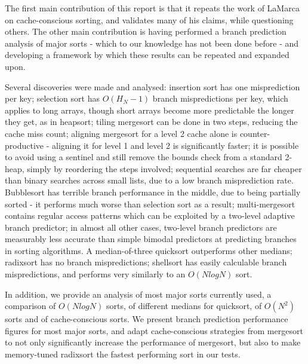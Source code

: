 The first main contribution of this report is that it repeats the work of LaMarca
on cache-conscious sorting, and validates many of his claims, while questioning
others. The other main contribution is having performed a branch prediction
analysis of major sorts - which to our knowledge has not been done before - and
developing a framework by which these results can be repeated and expanded upon.

Several discoveries were made and analysed: insertion sort has one misprediction
per key; selection sort has $O(H_N-1)$ branch mispredictions per key, which
applies to long arrays, though short arrays become more predictable the longer
they get, as in heapsort; tiling mergesort can be done in two steps, reducing
the cache miss count; aligning mergesort for a level 2 cache alone is
counter-productive - aligning it for level 1 and level 2 is significantly
faster; it is possible to avoid using a sentinel and still remove the bounds
check from a standard 2-heap, simply by reordering the steps involved;
sequential searches are far cheaper than binary searches across small lists, due
to a low branch misprediction rate. Bubblesort has terrible branch performance
in the middle, due to being partially sorted - it performs much worse than
selection sort as a result; multi-mergesort contains regular access patterns
which can be exploited by a two-level adaptive branch predictor; in almost all
other cases, two-level branch predictors are measurably less accurate than
simple bimodal predictors at predicting branches in sorting algorithms. A
median-of-three quicksort outperforms other medians; radixsort has no branch
mispredictions; shellsort has easily calculable branch mispredictions, and
performs very similarly to an $O(NlogN)$ sort. 

In addition, we provide an analysis of most major sorts currently used, a
comparison of $O(NlogN)$ sorts, of different medians for quicksort, of $O(N^2)$
sorts and of cache-conscious sorts. We present branch prediction performance
figures for most major sorts, and adapt cache-conscious strategies from
mergesort to not only significantly increase the performance of mergesort, but
also to make memory-tuned radixsort the fastest performing sort in our tests.

